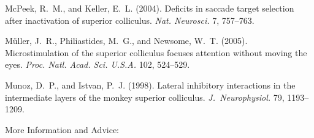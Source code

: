 \begin{thebibliography}{}
 McPeek, R.~M.,
and Keller, E.~L.  (2004). Deficits in saccade target selection after
inactivation of superior colliculus. \textit{Nat. Neurosci.} 7,
757--763.

 M\"{u}ller,
J.~R., Philiastides, M.~G., and Newsome, W.~T.  (2005).
Microstimulation of the superior colliculus focuses attention without
moving the eyes. \textit{Proc. Natl. Acad. Sci. U.S.A.} 102, 524--529.

 Munoz, D.~P.,
and Istvan, P.~J.  (1998). Lateral inhibitory interactions in
the intermediate layers of the monkey superior colliculus.
\textit{J.~Neurophysiol.} 79, 1193--1209.

\end{thebibliography}




\listofchanges






More Information and Advice:

%
%


